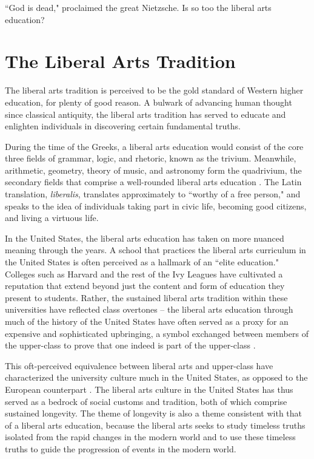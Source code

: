 \documentclass[12pt,letterpaper]{article}
\newif\ifdraft
\begin{document}
\ifdraft
And I too was one of them, and there I looked, just couldn't help but noticing a certain look in Puett's face that can best be described as pity.
\fi

``God is dead," proclaimed the great Nietzsche.  Is so too the liberal arts education?

\section{The Liberal Arts Tradition}
The liberal arts tradition is perceived to be the gold standard of Western higher education, for plenty of good reason.  A bulwark of advancing human thought since classical antiquity, the liberal arts tradition has served to educate and enlighten individuals in discovering certain fundamental truths.

During the time of the Greeks, a liberal arts  education would consist of the core three fields of grammar, logic, and rhetoric, known as the trivium.  Meanwhile, arithmetic, geometry, theory of music, and astronomy form the quadrivium, the secondary fields that comprise a well-rounded liberal arts education \cite{tubbs_philosophy_2015}.  The Latin translation, \textit{liberalis}, translates approximately to ``worthy of a free person," and speaks to the idea of individuals taking part in civic life, becoming good citizens, and living a virtuous life.  

In the United States, the liberal arts education has taken on more nuanced meaning through the years.  A school that practices the liberal arts curriculum in the United States is often perceived as a hallmark of an ``elite education."  Colleges such as Harvard and the rest of the Ivy Leagues have cultivated a reputation that extend beyond just the content and form of education they present to students.  Rather, the sustained liberal arts tradition within these universities have reflected class overtones -- the liberal arts education through much of the history of the United States have often served as a proxy for an expensive and sophisticated upbringing, a symbol exchanged between members of the upper-class to prove that one indeed is part of the upper-class \cite{}.  

This oft-perceived equivalence between liberal arts and upper-class have characterized the university culture much in the United States, as opposed to the European counterpart \cite{}.  The liberal arts culture in the United States has thus served as a bedrock of social customs and tradition, both of which comprise sustained longevity.  The theme of longevity is also a theme consistent with that of a liberal arts education, because the liberal arts seeks to study timeless truths isolated from the rapid changes in the modern world and to use these timeless truths to guide the progression of events in the modern world.
\end{document}
